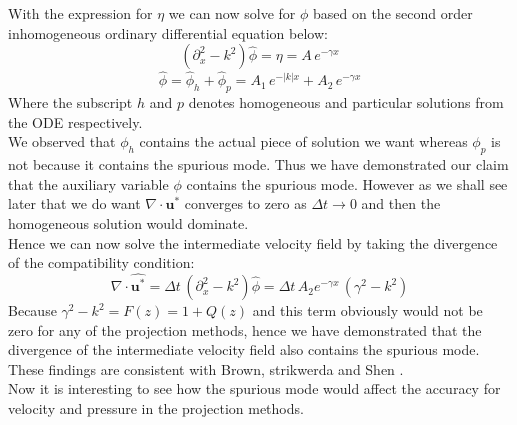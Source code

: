 With the expression for $\eta$ we can now solve for $\phi$ based on the second order inhomogeneous ordinary differential equation below:
\begin{equation}
(\partial_x^2 - k^2)\hat{\phi} = \eta = A\,e^{-\gamma x}
\end{equation}
\begin{equation}\label{eq:solution of numerical phi}
\hat{\phi} = \hat{\phi}_h + \hat{\phi}_p = A_1\,e^{-|k|x} + A_2 \,e^{-\gamma x}
\end{equation}
Where the subscript $h$ and $p$ denotes homogeneous and particular solutions from the ODE respectively.\\
We observed that $\phi_h$ contains the actual piece of solution we want whereas $\phi_p$ is not because it contains the spurious mode. Thus we have demonstrated our claim that the auxiliary variable $\phi$ contains the spurious mode. However as we shall see later that we do want $\nabla \cdot \textbf{u}^*$ converges to zero as $\Delta t \rightarrow 0$ and then the homogeneous solution would dominate.\\
Hence we can now solve the intermediate velocity field by taking the divergence of the compatibility condition:
\begin{equation}
\nabla \cdot \hat{\textbf{u}^*} = \Delta t \,(\partial_x^2 - k^2)\hat{\phi} = \Delta t\,A_2 e^{-\gamma x}\,(\gamma^2 - k^2)
\end{equation}
Because $\gamma^2 - k^2 = F(z) = 1 + Q(z)$ and this term obviously would not be zero for any of the projection methods, hence we have demonstrated that the divergence of the intermediate velocity field also contains the spurious mode. These findings are consistent with Brown, strikwerda and Shen \cite{brown2001accurate, strikwerda1999accuracy}.\\

Now it is interesting to see how the spurious mode would affect the accuracy for velocity and pressure in the projection methods. \\

